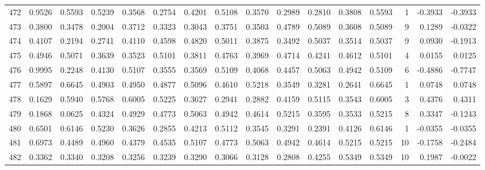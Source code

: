 \begin{tabular}{lrrrrrrrrrrrrrrr}
472 &      0.9526 &  0.5593 &  0.5239 &  0.3568 &  0.2754 &  0.4201 &  0.5108 &  0.3570 &  0.2989 &  0.2810 &   0.3808 &     0.5593 &      1 &                   -0.3933 &                    -0.3933 \\
473 &      0.3800 &  0.3478 &  0.2004 &  0.3712 &  0.3323 &  0.3043 &  0.3751 &  0.3503 &  0.4789 &  0.5089 &   0.3608 &     0.5089 &      9 &                    0.1289 &                    -0.0322 \\
474 &      0.4107 &  0.2194 &  0.2741 &  0.4110 &  0.4598 &  0.4820 &  0.5011 &  0.3875 &  0.3492 &  0.5037 &   0.3514 &     0.5037 &      9 &                    0.0930 &                    -0.1913 \\
475 &      0.4946 &  0.5071 &  0.3639 &  0.3523 &  0.5101 &  0.3811 &  0.4763 &  0.3969 &  0.4714 &  0.4241 &   0.4612 &     0.5101 &      4 &                    0.0155 &                     0.0125 \\
476 &      0.9995 &  0.2248 &  0.4130 &  0.5107 &  0.3555 &  0.3569 &  0.5109 &  0.4068 &  0.4457 &  0.5063 &   0.4942 &     0.5109 &      6 &                   -0.4886 &                    -0.7747 \\
477 &      0.5897 &  0.6645 &  0.4903 &  0.4950 &  0.4877 &  0.5096 &  0.4610 &  0.5218 &  0.3549 &  0.3281 &   0.2641 &     0.6645 &      1 &                    0.0748 &                     0.0748 \\
478 &      0.1629 &  0.5940 &  0.5768 &  0.6005 &  0.5225 &  0.3627 &  0.2941 &  0.2882 &  0.4159 &  0.5115 &   0.3543 &     0.6005 &      3 &                    0.4376 &                     0.4311 \\
479 &      0.1868 &  0.0625 &  0.4324 &  0.4929 &  0.4773 &  0.5063 &  0.4942 &  0.4614 &  0.5215 &  0.3595 &   0.3533 &     0.5215 &      8 &                    0.3347 &                    -0.1243 \\
480 &      0.6501 &  0.6146 &  0.5230 &  0.3626 &  0.2855 &  0.4213 &  0.5112 &  0.3545 &  0.3291 &  0.2391 &   0.4126 &     0.6146 &      1 &                   -0.0355 &                    -0.0355 \\
481 &      0.6973 &  0.4489 &  0.4960 &  0.4379 &  0.4535 &  0.5107 &  0.4773 &  0.5063 &  0.4942 &  0.4614 &   0.5215 &     0.5215 &     10 &                   -0.1758 &                    -0.2484 \\
482 &      0.3362 &  0.3340 &  0.3208 &  0.3256 &  0.3239 &  0.3290 &  0.3066 &  0.3128 &  0.2808 &  0.4255 &   0.5349 &     0.5349 &     10 &                    0.1987 &                    -0.0022 \\

\end{tabular}
